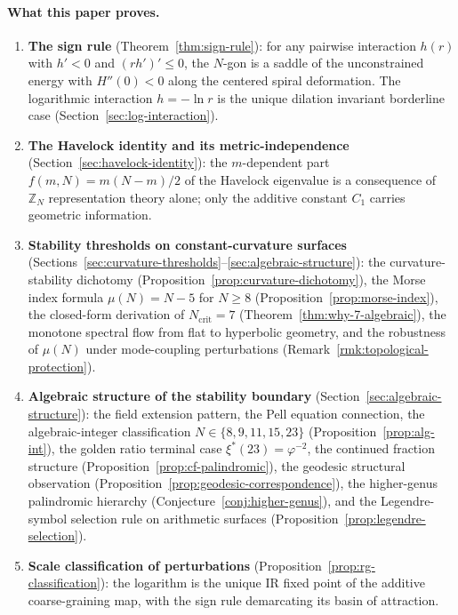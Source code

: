 \paragraph{What this paper proves.}
\begin{enumerate}
  \item \textbf{The sign rule} (Theorem~\ref{thm:sign-rule}):
    for any pairwise interaction $h(r)$ with $h' < 0$ and
    $(rh')' \le 0$, the $N$-gon is a saddle of the unconstrained
    energy with $H''(0) < 0$ along the centered spiral deformation.
    The logarithmic interaction $h = -\ln r$ is the unique
    dilation invariant borderline case (Section~\ref{sec:log-interaction}).
  \item \textbf{The Havelock identity and its metric-independence}
    (Section~\ref{sec:havelock-identity}):
    the $m$-dependent part $f(m,N) = m(N{-}m)/2$ of the Havelock
    eigenvalue is a consequence of $\mathbb{Z}_N$ representation
    theory alone; only the additive constant $C_1$ carries geometric
    information.
  \item \textbf{Stability thresholds on constant-curvature surfaces}
    (Sections~\ref{sec:curvature-thresholds}--\ref{sec:algebraic-structure}):
    the curvature-stability dichotomy
    (Proposition~\ref{prop:curvature-dichotomy}),
    the Morse index formula $\mu(N) = N - 5$ for $N \ge 8$
    (Proposition~\ref{prop:morse-index}), the closed-form derivation
    of $N_{\mathrm{crit}} = 7$ (Theorem~\ref{thm:why-7-algebraic}),
    the monotone spectral flow from flat to hyperbolic geometry,
    and the robustness of $\mu(N)$ under mode-coupling
    perturbations (Remark~\ref{rmk:topological-protection}).
  \item \textbf{Algebraic structure of the stability boundary}
    (Section~\ref{sec:algebraic-structure}):
    the field extension pattern, the Pell equation connection,
    the algebraic-integer classification
    $N \in \{8, 9, 11, 15, 23\}$
    (Proposition~\ref{prop:alg-int}), the golden ratio terminal case
    $\xi^*(23) = \varphi^{-2}$, the continued fraction structure
    (Proposition~\ref{prop:cf-palindromic}),
    the geodesic structural observation
    (Proposition~\ref{prop:geodesic-correspondence}),
    the higher-genus palindromic hierarchy
    (Conjecture~\ref{conj:higher-genus}),
    and the Legendre-symbol selection rule on arithmetic surfaces
    (Proposition~\ref{prop:legendre-selection}).
  \item \textbf{Scale classification of perturbations}
    (Proposition~\ref{prop:rg-classification}):
    the logarithm is the unique IR fixed point of the additive
    coarse-graining map, with the sign rule demarcating its basin of
    attraction.
\end{enumerate}



